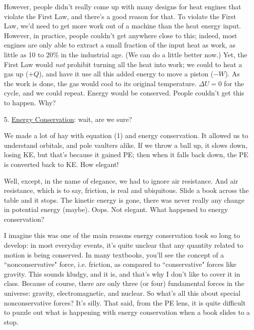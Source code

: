 \documentclass[12pt]{article}
\begin{document}
However, people didn't really come up with many designs for heat engines that violate the First Law, and there's a good reason for that. To violate the First Law, we'd need to get more work out of a machine than the heat energy input. However, in practice, people couldn't get anywhere close to this; indeed, most engines are only able to extract a small fraction of the input heat as work, as little as 10 to 20\% in the industrial age. (We can do a little better now.) Yet, the First Law would \textit{not} prohibit turning all the heat into work; we could to heat a gas up ($+Q$), and have it use all this added energy to move a piston ($-W$). As the work is done, the gas would cool to its original temperature. $\Delta U =0$ for the cycle, and we could repeat. Energy would be conserved. People couldn't get this to happen.  Why?

5. \underline{Energy Conservation}: wait, are we sure?

We made a lot of hay with equation (1) and energy conservation. It allowed us to understand orbitals, and pole vaulters alike. If we throw a ball up, it slows down, losing KE, but that's because it gained PE; then when it falls back down, the PE is converted back to KE. How elegant! 

Well, except, in the name of elegance, we had to ignore air resistance. And air resistance, which is to say, friction, is real and ubiquitous. Slide a book across the table and it stops. The kinetic energy is gone, there was never really any change in potential energy (maybe). Oops. Not elegant. What happened to energy conservation? 

I imagine this was one of the main reasons energy conservation took so long to develop: in most everyday events, it's quite unclear that any quantity related to motion is being conserved. In many textbooks, you'll see the concept of a ``nonconservative" force, i.e. friction, as compared to ``conservative" forces like gravity. This sounds kludgy, and it is, and that's why I don't like to cover it in class. Because of course, there are only three (or four) fundamental forces in the universe: gravity, electromagnetic, and nuclear. So what's all this about special nonconservative forces? It's silly. That said, from the PE lens, it is quite difficult to puzzle out what is happening with energy conservation when a book slides to a stop.
\end{document}
